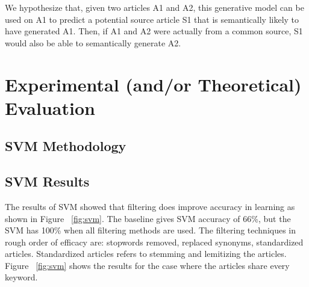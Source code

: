 \documentclass[11pt,letterpaper,oneside, titlepage]{scrartcl}
\begin{document}
We hypothesize that, given two articles A1 and A2, this generative model can be used on A1 to predict a potential source article S1 that is semantically likely to have generated A1. Then, if A1 and A2 were actually from a common source, S1 would also be able to semantically generate A2.


\section{Experimental (and/or Theoretical) Evaluation }



\subsection{SVM Methodology}





\subsection{SVM Results}


The results of SVM showed that filtering does improve accuracy in learning as shown in Figure ~\ref{fig:svm}. The baseline gives SVM accuracy of 66\%, but the SVM has 100\% when all filtering methods are used. The filtering techniques in rough order of efficacy are: stopwords removed, replaced synonyms, standardized articles. Standardized articles refers to stemming and lemitizing the articles. Figure ~\ref{fig:svm} shows the results for the case where the articles share every keyword.
\end{document}
